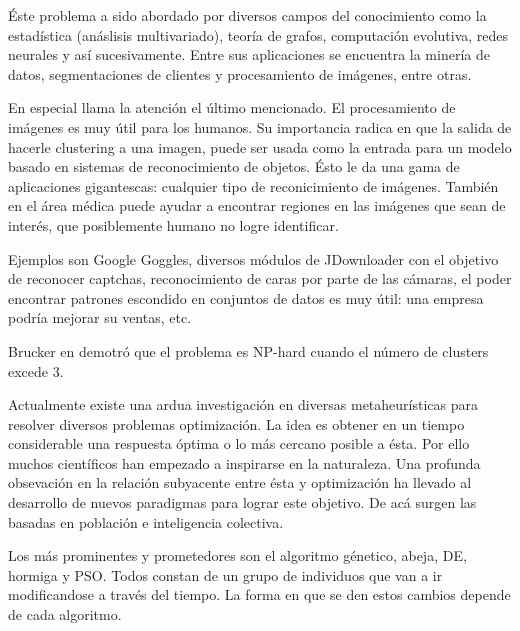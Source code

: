 \'Este problema a sido abordado por diversos campos del conocimiento como la estad\'istica
(an\'aslisis multivariado), teor\'ia de grafos, computaci\'on evolutiva, redes neurales y
as\'i sucesivamente\cite{SwAjAm2009}. Entre sus aplicaciones se encuentra la miner\'ia de datos, 
segmentaciones de clientes y procesamiento de im\'agenes, entre otras. \cite{GaChJi2007}

En especial llama la atenci\'on el \'ultimo mencionado. El procesamiento de im\'agenes es muy \'util para los
humanos. Su importancia radica en que la salida de hacerle clustering a una imagen, puede ser usada como la entrada para 
un modelo basado en sistemas de reconocimiento de objetos.
\'Esto le da una gama de aplicaciones gigantescas: cualquier tipo de reconicimiento de im\'agenes.
Tambi\'en en el \'area m\'edica puede ayudar a encontrar regiones en las im\'agenes que sean de inter\'es,
que posiblemente humano no logre identificar.

Ejemplos son Google Goggles, diversos m\'odulos de JDownloader con el objetivo de reconocer
captchas, reconocimiento de caras por parte de las c\'amaras, el poder encontrar patrones escondido en
conjuntos de datos es muy \'util: una empresa podr\'ia mejorar su ventas, etc.

Brucker en \cite{Br1978} demotr\'o que el problema es NP-hard cuando el n\'umero 
de clusters excede 3.

\vspace{5 mm}

\label{sect:planteamiento}
\vspace{5 mm}

Actualmente existe una ardua investigaci\'on en diversas metaheur\'isticas para
resolver diversos problemas optimizaci\'on. La idea es obtener en un tiempo
considerable una respuesta \'optima o lo m\'as cercano posible a \'esta. Por
ello muchos cient\'ificos han empezado a inspirarse en la naturaleza.
Una profunda obsevaci\'on en la relaci\'on subyacente 
entre \'esta y optimizaci\'on ha llevado al desarrollo de nuevos paradigmas
para lograr este objetivo\cite{SwAjAm2009}. De ac\'a surgen las basadas en poblaci\'on e inteligencia
colectiva.

Los m\'as prominentes y prometedores son el algoritmo g\'enetico, abeja, DE, hormiga
y PSO. Todos constan de un grupo de individuos que van a ir modificandose a trav\'es
del tiempo. La forma en que se den estos cambios depende de cada algoritmo.

